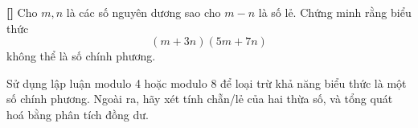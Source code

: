 \documentclass[../05-modular-arithmetic-a.tex]{subfiles}
\begin{document}
\begin{exercise*}\label{example:THA-2015-MO-P8}\textbf{[]}
    Cho \( m, n \) là các số nguyên dương sao cho \( m - n \) là số lẻ. Chứng minh rằng biểu thức
    \[
        (m + 3n)(5m + 7n)
    \]
    không thể là số chính phương.
\end{exercise*}

\begin{remark*}
    Sử dụng lập luận modulo 4 hoặc modulo 8 để loại trừ khả năng biểu thức là một số chính phương.
    Ngoài ra, hãy xét tính chẵn/lẻ của hai thừa số, và tổng quát hoá bằng phân tích đồng dư.
\end{remark*}



\end{document}
